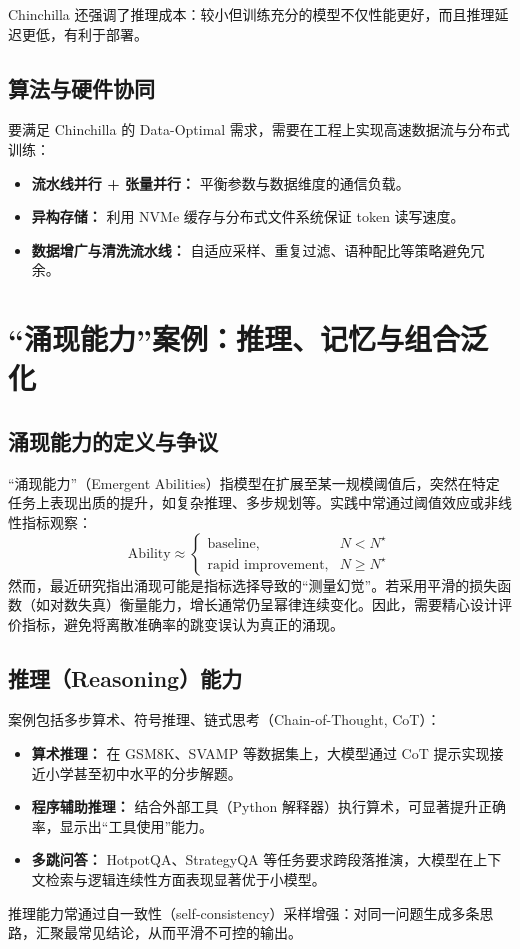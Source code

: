 \documentclass[UTF8,zihao=-4]{ctexart}
\begin{document}
Chinchilla 还强调了推理成本：较小但训练充分的模型不仅性能更好，而且推理延迟更低，有利于部署。

\subsection{算法与硬件协同}
要满足 Chinchilla 的 Data-Optimal 需求，需要在工程上实现高速数据流与分布式训练：
\begin{itemize}
  \item \textbf{流水线并行 + 张量并行：} 平衡参数与数据维度的通信负载。
  \item \textbf{异构存储：} 利用 NVMe 缓存与分布式文件系统保证 token 读写速度。
  \item \textbf{数据增广与清洗流水线：} 自适应采样、重复过滤、语种配比等策略避免冗余。
\end{itemize}

\section{“涌现能力”案例：推理、记忆与组合泛化}
\subsection{涌现能力的定义与争议}
“涌现能力”（Emergent Abilities）指模型在扩展至某一规模阈值后，突然在特定任务上表现出质的提升，如复杂推理、多步规划等。实践中常通过阈值效应或非线性指标观察：
\begin{equation}
  \text{Ability} \approx \begin{cases}
    \text{baseline}, & N < N^\star \\
    \text{rapid improvement}, & N \ge N^\star
  \end{cases}
\end{equation}
然而，最近研究指出涌现可能是指标选择导致的“测量幻觉”。若采用平滑的损失函数（如对数失真）衡量能力，增长通常仍呈幂律连续变化。因此，需要精心设计评价指标，避免将离散准确率的跳变误认为真正的涌现。

\subsection{推理（Reasoning）能力}
案例包括多步算术、符号推理、链式思考（Chain-of-Thought, CoT）：
\begin{itemize}
  \item \textbf{算术推理：} 在 GSM8K、SVAMP 等数据集上，大模型通过 CoT 提示实现接近小学甚至初中水平的分步解题。
  \item \textbf{程序辅助推理：} 结合外部工具（Python 解释器）执行算术，可显著提升正确率，显示出“工具使用”能力。
  \item \textbf{多跳问答：} HotpotQA、StrategyQA 等任务要求跨段落推演，大模型在上下文检索与逻辑连续性方面表现显著优于小模型。
\end{itemize}
推理能力常通过自一致性（self-consistency）采样增强：对同一问题生成多条思路，汇聚最常见结论，从而平滑不可控的输出。
\end{document}
